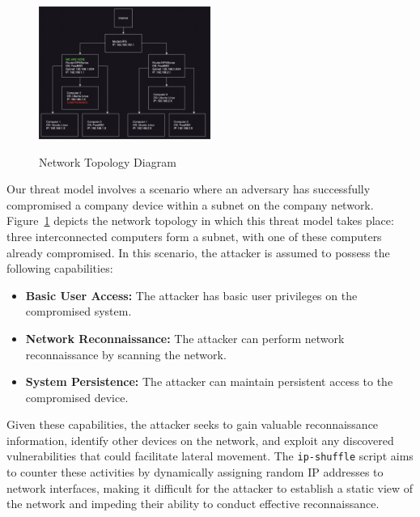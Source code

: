 \begin{figure}
 \caption{Network Topology Diagram}
  \centering
   \includegraphics[width=0.5\textwidth]{diagram.png}
   \label{fig:network-topology}
\end{figure}


Our threat model involves a scenario where an adversary has successfully compromised a company device within a subnet on the company network. Figure~\ref{fig:network-topology} depicts the network topology in which this threat model takes place: three interconnected computers form a subnet, with one of these computers already compromised. In this scenario, the attacker is assumed to possess the following capabilities:
\begin{itemize}
    \item \textbf{Basic User Access:} The attacker has basic user privileges on the compromised system.
    \item \textbf{Network Reconnaissance:} The attacker can perform network reconnaissance by scanning the network.
    \item \textbf{System Persistence:} The attacker can maintain persistent access to the compromised device.
\end{itemize}
Given these capabilities, the attacker seeks to gain valuable reconnaissance information, identify other devices on the network, and exploit any discovered vulnerabilities that could facilitate lateral movement. The \texttt{ip-shuffle} script aims to counter these activities by dynamically assigning random IP addresses to network interfaces, making it difficult for the attacker to establish a static view of the network and impeding their ability to conduct effective reconnaissance.
